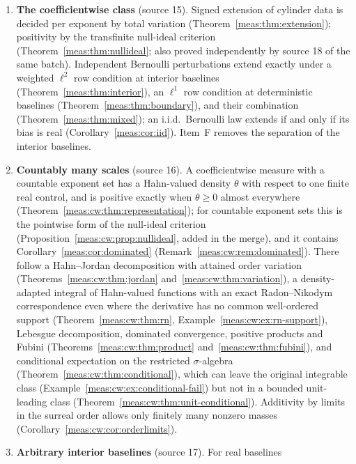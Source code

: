 \documentclass[11pt]{article}
\numberwithin{equation}{section}
\theoremstyle{definition}
\theoremstyle{remark}
\begin{document}
\begin{enumerate}[label=\textbf{\Alph*.},leftmargin=2em]
(Theorem~\ref{meas:thm:threshold}). Hankel determinant valuations
(Theorem~\ref{meas:thm:determinants}) and Gaussian quadratures with
non-Archimedean nodes (Theorems~\ref{meas:thm:gauss}
and~\ref{meas:thm:quadratureresidues}) are computed exactly.
\item \textbf{The coefficientwise class} (source 15). Signed extension of
cylinder data is decided per exponent by total variation
(Theorem~\ref{meas:thm:extension}); positivity by the transfinite null-ideal
criterion (Theorem~\ref{meas:thm:nullideal}; also proved independently by
source 18 of the same batch). Independent Bernoulli perturbations extend
exactly under a weighted $\ell^2$ row condition at interior baselines
(Theorem~\ref{meas:thm:interior}), an $\ell^1$ row condition at deterministic
baselines (Theorem~\ref{meas:thm:boundary}), and their combination
(Theorem~\ref{meas:thm:mixed}); an i.i.d.\ Bernoulli law extends if and only
if its bias is real (Corollary~\ref{meas:cor:iid}). Item~F removes the
separation of the interior baselines.
\item \textbf{Countably many scales} (source 16). A coefficientwise measure with a
countable exponent set has a Hahn-valued density $\theta$ with respect to one finite
real control, and is positive exactly when $\theta\ge0$ almost everywhere
(Theorem~\ref{meas:cw:thm:representation}); for countable exponent sets this is
the pointwise form of the null-ideal criterion
(Proposition~\ref{meas:cw:prop:nullideal}, added in the merge), and it contains
Corollary~\ref{meas:cor:dominated} (Remark~\ref{meas:cw:rem:dominated}). There
follow a Hahn--Jordan decomposition with attained order variation
(Theorems~\ref{meas:cw:thm:jordan} and~\ref{meas:cw:thm:variation}), a
density-adapted integral of Hahn-valued functions with an exact Radon--Nikodym
correspondence even where the derivative has no common well-ordered support
(Theorem~\ref{meas:cw:thm:rn}, Example~\ref{meas:cw:ex:rn-support}), Lebesgue
decomposition, dominated convergence, positive products and Fubini
(Theorems~\ref{meas:cw:thm:product} and~\ref{meas:cw:thm:fubini}), and
conditional expectation on the restricted $\sigma$-algebra
(Theorem~\ref{meas:cw:thm:conditional}), which can leave the original integrable
class (Example~\ref{meas:cw:ex:conditional-fail}) but not in a bounded
unit-leading class (Theorem~\ref{meas:cw:thm:unit-conditional}). Additivity by
limits in the surreal order allows only finitely many nonzero masses
(Corollary~\ref{meas:cw:cor:orderlimits}).
\item \textbf{Arbitrary interior baselines} (source 17). For real baselines

\end{enumerate}
\end{document}
